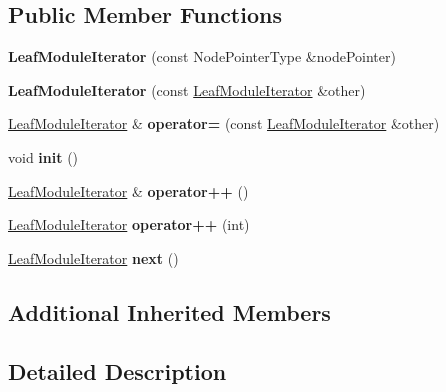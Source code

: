 \subsection*{Public Member Functions}
\begin{DoxyCompactItemize}
\item 
\mbox{\label{classLeafModuleIterator_a51d8bd2b5155517d415065b4736ac17e}} 
{\bfseries Leaf\+Module\+Iterator} (const Node\+Pointer\+Type \&node\+Pointer)
\item 
\mbox{\label{classLeafModuleIterator_ab0ecb579530477129f8ad6e334014c96}} 
{\bfseries Leaf\+Module\+Iterator} (const \mbox{\hyperlink{classLeafModuleIterator}{Leaf\+Module\+Iterator}} \&other)
\item 
\mbox{\label{classLeafModuleIterator_a9190c82fabd646727b372d88ac25090a}} 
\mbox{\hyperlink{classLeafModuleIterator}{Leaf\+Module\+Iterator}} \& {\bfseries operator=} (const \mbox{\hyperlink{classLeafModuleIterator}{Leaf\+Module\+Iterator}} \&other)
\item 
\mbox{\label{classLeafModuleIterator_a50ce5b14891f0abb7d2cacce606940ed}} 
void {\bfseries init} ()
\item 
\mbox{\label{classLeafModuleIterator_aa4a6dfa31bce15d45f6aa8e89e02ec68}} 
\mbox{\hyperlink{classLeafModuleIterator}{Leaf\+Module\+Iterator}} \& {\bfseries operator++} ()
\item 
\mbox{\label{classLeafModuleIterator_aea4e3f9b4160552d3271282ed2ca4546}} 
\mbox{\hyperlink{classLeafModuleIterator}{Leaf\+Module\+Iterator}} {\bfseries operator++} (int)
\item 
\mbox{\label{classLeafModuleIterator_a963933220ef31aa6ac53e5496bc02ac1}} 
\mbox{\hyperlink{classLeafModuleIterator}{Leaf\+Module\+Iterator}} {\bfseries next} ()
\end{DoxyCompactItemize}
\subsection*{Additional Inherited Members}


\subsection{Detailed Description}
